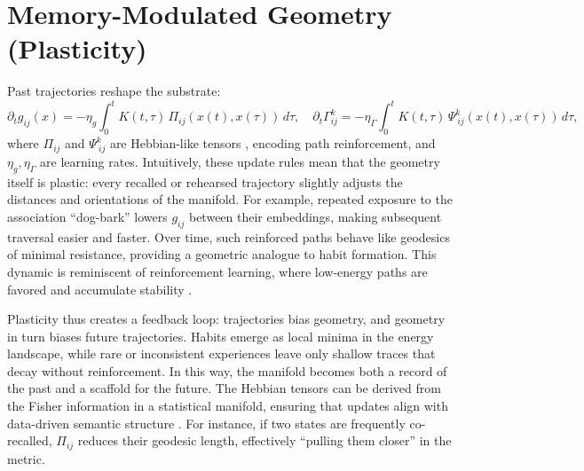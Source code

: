 \documentclass[a4paper,12pt]{article}
\begin{document}
\section{Memory-Modulated Geometry (Plasticity)}
Past trajectories reshape the substrate:
\[
\partial_t g_{ij}(x) = -\eta_g \int_0^t K(t,\tau) \, \Pi_{ij}(x(t), x(\tau)) \, d\tau, \quad \partial_t \Gamma^k_{ij} = -\eta_\Gamma \int_0^t K(t,\tau) \, \Psi^k_{\ ij}(x(t), x(\tau)) \, d\tau,
\]
where $\Pi_{ij}$ and $\Psi^k_{\ ij}$ are Hebbian-like tensors \citep{hebb1949organization}, encoding path reinforcement, and $\eta_g, \eta_\Gamma$ are learning rates. Intuitively, these update rules mean that the geometry itself is plastic: every recalled or rehearsed trajectory slightly adjusts the distances and orientations of the manifold. For example, repeated exposure to the association ``dog-bark'' lowers $g_{ij}$ between their embeddings, making subsequent traversal easier and faster. Over time, such reinforced paths behave like geodesics of minimal resistance, providing a geometric analogue to habit formation. This dynamic is reminiscent of reinforcement learning, where low-energy paths are favored and accumulate stability \citep{sutton2018reinforcement}. 

Plasticity thus creates a feedback loop: trajectories bias geometry, and geometry in turn biases future trajectories. Habits emerge as local minima in the energy landscape, while rare or inconsistent experiences leave only shallow traces that decay without reinforcement. In this way, the manifold becomes both a record of the past and a scaffold for the future. The Hebbian tensors can be derived from the Fisher information in a statistical manifold, ensuring that updates align with data-driven semantic structure \citep{amari1985differential}. For instance, if two states are frequently co-recalled, $\Pi_{ij}$ reduces their geodesic length, effectively ``pulling them closer'' in the metric.
\end{document}
